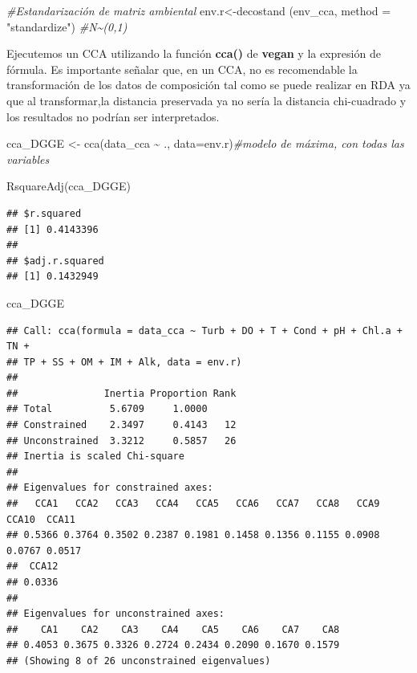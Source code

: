 \documentclass[
]{book}
\newenvironment{Shaded}{\begin{snugshade}}{\end{snugshade}}
\newcommand{\AttributeTok}[1]{\textcolor[rgb]{0.77,0.63,0.00}{#1}}
\newcommand{\CommentTok}[1]{\textcolor[rgb]{0.56,0.35,0.01}{\textit{#1}}}
\newcommand{\FunctionTok}[1]{\textcolor[rgb]{0.00,0.00,0.00}{#1}}
\newcommand{\NormalTok}[1]{#1}
\newcommand{\OtherTok}[1]{\textcolor[rgb]{0.56,0.35,0.01}{#1}}
\newcommand{\SpecialCharTok}[1]{\textcolor[rgb]{0.00,0.00,0.00}{#1}}
\newcommand{\StringTok}[1]{\textcolor[rgb]{0.31,0.60,0.02}{#1}}
\begin{document}
\begin{Shaded}
\begin{Highlighting}[]
\CommentTok{\#Estandarización de matriz ambiental}
\NormalTok{env.r}\OtherTok{\textless{}{-}}\FunctionTok{decostand}\NormalTok{ (env\_cca, }\AttributeTok{method =} \StringTok{"standardize"}\NormalTok{) }\CommentTok{\#N\textasciitilde{}(0,1)}
\end{Highlighting}
\end{Shaded}

Ejecutemos un CCA utilizando la función \textbf{cca()} de \textbf{vegan} y la expresión de fórmula. Es importante señalar que, en un CCA, no es recomendable la transformación de los datos de composición tal como se puede realizar en RDA ya que al transformar,la distancia preservada ya no sería la distancia chi-cuadrado y los resultados no podrían ser interpretados.

\begin{Shaded}
\begin{Highlighting}[]
\NormalTok{cca\_DGGE }\OtherTok{\textless{}{-}} \FunctionTok{cca}\NormalTok{(data\_cca }\SpecialCharTok{\textasciitilde{}}\NormalTok{ ., }\AttributeTok{data=}\NormalTok{env.r)}\CommentTok{\#modelo de máxima, con todas las variables}

\FunctionTok{RsquareAdj}\NormalTok{(cca\_DGGE) }
\end{Highlighting}
\end{Shaded}

\begin{verbatim}
## $r.squared
## [1] 0.4143396
## 
## $adj.r.squared
## [1] 0.1432949
\end{verbatim}

\begin{Shaded}
\begin{Highlighting}[]
\NormalTok{cca\_DGGE}
\end{Highlighting}
\end{Shaded}

\begin{verbatim}
## Call: cca(formula = data_cca ~ Turb + DO + T + Cond + pH + Chl.a + TN +
## TP + SS + OM + IM + Alk, data = env.r)
## 
##               Inertia Proportion Rank
## Total          5.6709     1.0000     
## Constrained    2.3497     0.4143   12
## Unconstrained  3.3212     0.5857   26
## Inertia is scaled Chi-square 
## 
## Eigenvalues for constrained axes:
##   CCA1   CCA2   CCA3   CCA4   CCA5   CCA6   CCA7   CCA8   CCA9  CCA10  CCA11 
## 0.5366 0.3764 0.3502 0.2387 0.1981 0.1458 0.1356 0.1155 0.0908 0.0767 0.0517 
##  CCA12 
## 0.0336 
## 
## Eigenvalues for unconstrained axes:
##    CA1    CA2    CA3    CA4    CA5    CA6    CA7    CA8 
## 0.4053 0.3675 0.3326 0.2724 0.2434 0.2090 0.1670 0.1579 
## (Showing 8 of 26 unconstrained eigenvalues)
\end{verbatim}
\end{document}
